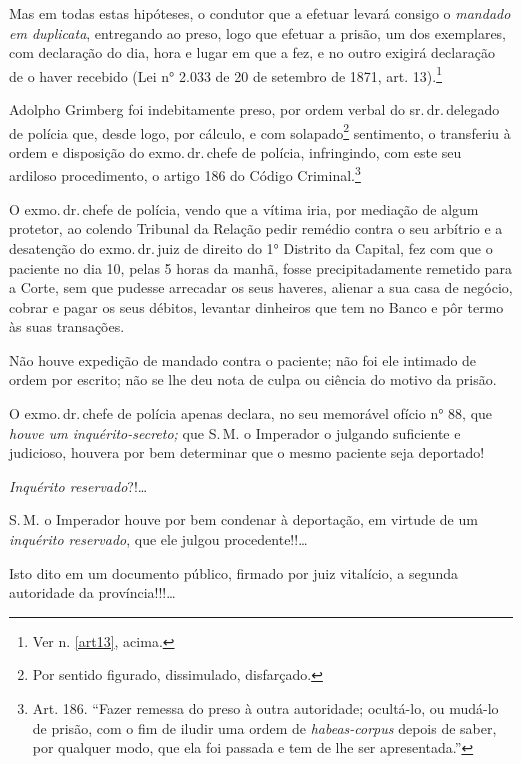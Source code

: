 Mas em todas estas hipóteses, o condutor que a efetuar levará consigo o
\emph{mandado em duplicata}, entregando ao preso, logo que efetuar a
prisão, um dos exemplares, com declaração do dia, hora e lugar em que a
fez, e no outro exigirá declaração de o haver recebido (Lei n° 2.033 de
20 de setembro de 1871, art. 13).\footnote{Ver n. \ref{art13}, acima.}

Adolpho Grimberg foi indebitamente preso, por ordem verbal do sr.\,dr.\,delegado de polícia que, desde logo, por cálculo, e com
solapado\footnote{Por sentido figurado, dissimulado, disfarçado.}
sentimento, o transferiu à ordem e disposição do exmo.\,dr.\,chefe de
polícia, infringindo, com este seu ardiloso procedimento, o artigo 186
do Código Criminal.\footnote{Art. 186. ``Fazer remessa do preso
  à outra autoridade; ocultá-lo, ou mudá-lo de prisão, com o fim de
  iludir uma ordem de \emph{habeas-corpus} depois de saber, por qualquer
  modo, que ela foi passada e tem de lhe ser apresentada.''}

O exmo.\,dr.\,chefe de polícia, vendo que a vítima iria, por mediação de
algum protetor, ao colendo Tribunal da Relação pedir remédio contra o
seu arbítrio e a desatenção do exmo.\,dr.\,juiz de direito do 1° Distrito
da Capital, fez com que o paciente no dia 10, pelas 5 horas da manhã,
fosse precipitadamente remetido para a Corte, sem que pudesse arrecadar
os seus haveres, alienar a sua casa de negócio, cobrar e pagar os seus
débitos, levantar dinheiros que tem no Banco e pôr termo às suas
transações.

Não houve expedição de mandado contra o paciente; não foi ele intimado
de ordem por escrito; não se lhe deu nota de culpa ou ciência do motivo
da prisão.

O exmo.\,dr.\,chefe de polícia apenas declara, no seu memorável ofício n°
88, que \emph{houve um inquérito-secreto;} que S.\,M. o Imperador o
julgando suficiente e judicioso, houvera por bem determinar que o mesmo
paciente seja deportado!

\emph{Inquérito reservado}?!\ldots{}

S.\,M. o Imperador houve por bem condenar à deportação, em virtude de um
\emph{inquérito reservado}, que ele julgou procedente!!\ldots{}

Isto dito em um documento público, firmado por juiz vitalício, a segunda
autoridade da província!!!\ldots{}

